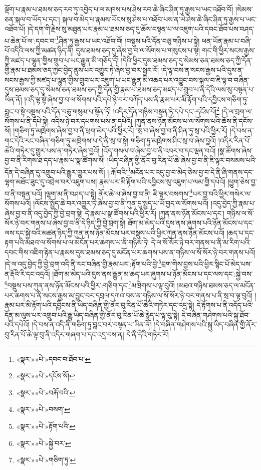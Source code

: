 ལྡོག་པ་རྣམ་པ་ཐམས་ཅད་རབ་ཏུ་འབྱེད་པ་ལ་མཁས་པས་ཤེས་རབ་ཆེ་ཞིང་ཤིན་ཏུ་རྒྱས་པ་ཡང་འཐོབ་བོ། །སེམས་ཅན་སྐལ་བ་ཡོད་པ་དང་། སྐལ་བ་མེད་པ་རྣམས་ཡོངས་སུ་ཤེས་པ་འཐོབ་པས་ན་ཡེ་ཤེས་ཆེ་ཞིང་ཤིན་ཏུ་རྒྱས་པ་ཡང་འཐོབ་པོ། །དེ་དག་གི་རྗེས་སུ་མཐུན་པར་རྣམ་པ་ཐམས་ཅད་དུ་ཆོས་བསྟན་པ་ལ་འཇུག་པའི་དབང་ཐོབ་པས་བཤད་པ་ཆེན་པོ་ལ་:དབང་བ་\footnote{«སྣར་»«པེ་»དབང་བ་ཐོབ་པ་}ཤིན་ཏུ་རྒྱས་པ་ཡང་འཐོབ་བོ། །བསྡུས་པའི་དོན་བཅུ་གཉིས་པ་སྟེ། ཕན་ཡོན་རྣམ་པ་བཞི་པོ་འདིའི་ལས་ཀྱི་མཚན་ཉིད་ནི། དུས་ཐམས་ཅད་དུ་ཞེས་བྱ་བ་ལ་སོགས་པ་གསུངས་པ་སྟེ། གང་གི་ཕྱིར་སངས་རྒྱས་ཀྱི་མཛད་པ་ལྷུན་གྱིས་གྲུབ་པ་ཡང་རྒྱུན་མི་གཅོད་དོ། །དེའི་ཕྱིར་དུས་ཐམས་ཅད་དུ་སེམས་ཅན་ཐམས་ཅད་ཀྱི་དོན་གྱི་རྣམ་པ་ཐམས་ཅད་ཀྱང་བྱེད་ནུས་པར་འགྱུར་ཏེ་ཞེས་བྱ་བར་སྦྱར་རོ། །དེ་ལྟ་བས་ན་སངས་རྒྱས་པའི་དུས་ན་སངས་རྒྱས་ཀྱི་མཛད་པ་ལྷུན་གྱིས་གྲུབ་པར་འཇུག་པ་ཡང་རྒྱུན་མི་འཆད་པར་འབྱུང་བས་སྐལ་བ་ཇི་ལྟ་བ་བཞིན་དུས་ཐམས་ཅད་དུ་སེམས་ཅན་ཐམས་ཅད་ཀྱི་དོན་གྱི་རྣམ་པ་ཐམས་ཅད་མཛད་པ་གྲུབ་པ་ནི་དེའི་ལས་སུ་བསྟན་པ་ཡིན་ནོ། །འདི་ལྟ་སྟེ་ཞེས་བྱ་བ་ལ་སོགས་པའི་དཔེ་ཉེ་བར་བཀོད་པས་ནི་རྣམ་པར་མི་རྟོག་པའི་དབྱིངས་གཅིག་ཏུ་བླང་བ་སྟེ་བསྡུས་པའི་དོན་བཅུ་གསུམ་པ་སྟོན་ཏོ། །འདིར་དོན་གཉིས་བསྟན་ཏེ་དཔེ་དང་:དངོས་པོ།\footnote{«སྣར་»«པེ་»དངོས་སོ།} །དེ་ལ་བྲག་ལ་སོགས་པ་ནི་དཔེ་སྟེ། འདིས་ཉེ་བར་དཔགས་པས་ན་དཔེའོ། །ཀུན་ནས་ཉོན་མོངས་པ་ལ་སོགས་པའི་ཆོས་ནི་དངོས་སོ། །གཅིག་ཏུ་མཁྲེགས་ཞེས་བྱ་བ་ནི་ཕྲག་མེད་པའི་ཕྱིར་རོ། །སྲ་བ་ཞེས་བྱ་བ་ནི་ཤིན་ཏུ་སྲ་པའི་ཕྱིར་རོ། །དེ་བས་ན་གང་དེའི་རང་བཞིན་གཅིག་ཏུ་མཁྲེགས་པ་དེ་ནི་སྲ་བ་སྟེ། གཅིག་ཏུ་མཁྲེགས་ཤིང་སྲ་བ་ཞེས་བྱའོ། །འདིར་རིན་པོ་ཆེའི་གཏེར་དུ་གྱུར་པས་ན་གཏེར་ཞེས་བྱའོ། །འོད་གསལ་བ་ཞེས་བྱ་བ་ནི་འབར་བ་དང་ལྡན་བའོ། །སྣ་ཚོགས་ཞེས་བྱ་བ་ནི་རིགས་ཐ་དད་པ་རྣམ་པ་སྣ་ཚོགས་སོ། །ཡིད་བཞིན་གྱི་ནོར་བུ་རིན་པོ་ཆེ་ཞེས་བྱ་བ་ནི་ཇི་ལྟར་བསམས་པའི་དོན་དེ་བཞིན་དུ་འགྲུབ་པའི་རྒྱུར་གྱུར་པས་སོ། །:རྐོ་བའི་\footnote{«སྣར་»«པེ་»བརྐོ་བའི་}མངོན་པར་འདུ་བྱ་བ་མེད་ཅེས་བྱ་བ་དེ་ནི་ཞི་གནས་དང་ལྷག་མཐོང་ཟུང་དུ་འབྲེལ་བར་འཇུག་པས། རྣམ་པར་མི་རྟོག་པའི་དབྱིངས་སུ་འཇུག་པ་ལམ་གྱི་དཔེའོ། །ཕྱུག་ཅེས་བྱ་བ་ནི་བསྟན་པའོ། །ལྷག་མ་ནི་བཤད་པ་སྟེ། ནོར་ཆེ་ལ་ཞེས་བྱ་བ་ནི། ཇི་ལྟར་བསགས་\footnote{«སྣར་»«པེ་»བསག་}པར་བྱ་བའི་ཕྱིར་གསེར་ལ་སོགས་པའོ། །ལོངས་སྤྱོད་ཆེ་བར་འགྱུར་ཏེ་ཞེས་བྱ་བ་ནི་ཀུན་དུ་སྤྱད་པ་ཡོ་བྱད་ལ་སོགས་པའོ། །འདུ་བྱེད་ཀྱི་རྣམ་པ་ཞེས་བྱ་བ་ནི་འདུ་བྱེད་ཀྱི་བྱེ་བྲག་སྟེ། དེ་རྣམ་པ་སྣ་ཚོགས་པའི་ཕྱིར་རོ། །ཀུན་ནས་ཉོན་མོངས་པ་དང་། གཉིས་ལ་སོ་སོར་ཉེ་བར་གནས་པ་ཞེས་བྱ་བ་ནི་དེ་ཉིད་ཀྱི་བྱེ་བྲག་སྟེ། ཐོག་མ་མེད་པའི་དུས་ནས་ཞུགས་པའི་ཉོན་མོངས་པ་དང་ལས་དང་སྐྱེ་བའི་མཚན་ཉིད་ཀྱི་ཀུན་ནས་ཉོན་མོངས་པར་བསྡུས་པའི་ཕྱིར་ཀུན་ནས་ཉོན་མོངས་པའོ། །ཆད་པ་དང་རྟག་པའི་མཐའ་ལ་སོགས་པ་ལ་མངོན་པར་ཆགས་པ་ནི་གཉིས་ཏེ། དེ་ལ་སོ་སོར་ཉེ་བར་གནས་པ་ནི་མ་རིག་པའི་དབང་གིས་འཇིག་རྟེན་པ་རྣམས་དུས་ཐམས་ཅད་དུ་མངོན་པར་ཆགས་པས་ན་གཉིས་ལ་སོ་སོར་ཉེ་བར་གནས་པའོ། །དེ་ལ་འདུ་བྱེད་ཀྱི་བྱེ་བྲག་འདི་ནི་རང་བཞིན་གྱི་རྣམ་པར་:རྟོག་པའི་བྱེ་\footnote{«སྣར་»«པེ་»རྟོག་པའི་}བྲག་གིས་བྱས་པའི་ཕྱིར་སྙིང་པོ་མེད་པས་ན་རྡོའི་རི་དང་འདྲའོ། །ཐོག་མ་མེད་པའི་དུས་ནས་རྒྱུན་མ་ཆད་པར་ཞུགས་པ་ཉོན་མོངས་པ་དང་ལས་དང་:སྐྱེ་བས་\footnote{«སྣར་»«པེ་»སྐྱེ་བར་}བསྡུས་པས་ཀུན་ནས་ཉོན་མོངས་པའི་ཕྱིར་:གཅིག་དང་\footnote{«སྣར་»«པེ་»གཅིག་ཏུ་}མཁྲེགས་པ་ལྟ་བུའོ། །མཐའ་གཉིས་ཐམས་ཅད་ལ་མངོན་པར་ཆགས་པ་ནི་སངས་རྒྱས་མ་བྱུང་བར་དབྲལ་དཀའ་བས་ན་གཉིས་ལ་སོ་སོར་ཉེ་བར་གནས་པ་ནི་སྲ་བ་ལྟ་བུའོ། །རྣམ་པར་མི་རྟོག་པའི་དབྱིངས་ནི་ཡིད་བཞིན་གྱི་ནོར་བུ་རིན་པོ་ཆེའི་གཏེར་དང་འདྲ་སྟེ། དེ་རྟོགས་པ་ནི་འདོད་པའི་དོན་མ་ལུས་པར་འགྲུབ་པའི་རྒྱུ་ཡིད་བཞིན་གྱི་ནོར་བུ་རིན་པོ་ཆེ་རྙེད་པ་ལྟ་བུ་སྟེ། དེ་བཞིན་གཤེགས་པའི་སྐུ་ཐོབ་པའི་དཔེའོ། །དེ་བས་ན་འདི་ནི་གཅིག་ཏུ་བླང་བར་བསྟན་པ་ཡིན་ནོ། །དེ་བཞིན་གཤེགས་པའི་སྐུ་ཡིད་བཞིན་གྱི་ནོར་བུ་རིན་པོ་ཆེ་ལྟ་བུ་ནི་འདིར་གཞག་པ་དང་འདྲ་བས་ན། དེ་ནི་དེའི་གཏེར་རོ། 